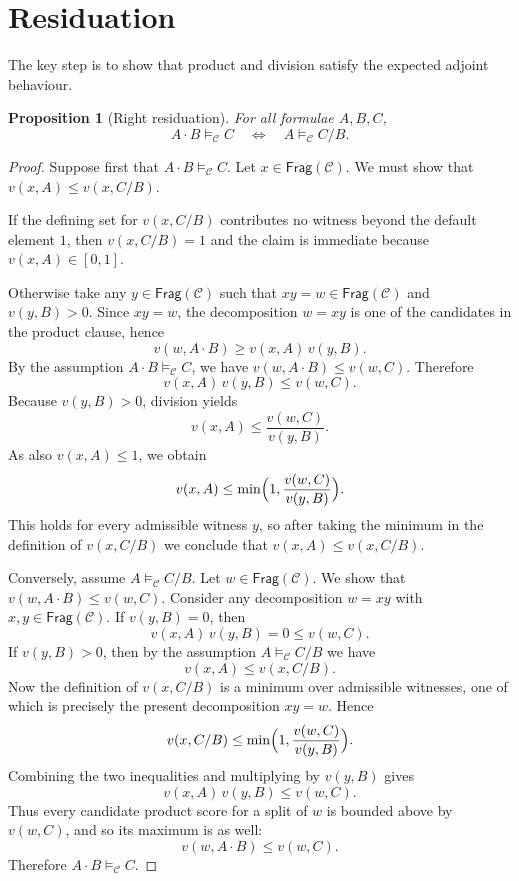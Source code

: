 \documentclass[12pt,a4paper]{report}
\newtheorem{proposition}[theorem]{Proposition}
\theoremstyle{definition}
\newcommand{\Frag}{\mathsf{Frag}}
\newcommand{\Sem}{\models_{\mathcal C}}
\newcommand{\concat}{\mathbin{\cdot}}
\begin{document}
\section{Residuation}
The key step is to show that product and division satisfy the expected adjoint behaviour.

\begin{proposition}[Right residuation]
For all formulae $A,B,C$,
\[
A\concat B \Sem C
\quad\Longleftrightarrow\quad
A \Sem C/B.
\]
\end{proposition}

\begin{proof}
Suppose first that $A\concat B \Sem C$. Let $x \in \Frag(\mathcal C)$. We must show that
$v(x,A) \leq v(x,C/B)$.

If the defining set for $v(x,C/B)$ contributes no witness beyond the default element $1$, then
$v(x,C/B)=1$ and the claim is immediate because $v(x,A) \in [0,1]$.

Otherwise take any $y \in \Frag(\mathcal C)$ such that $xy=w \in \Frag(\mathcal C)$ and
$v(y,B)>0$. Since $xy=w$, the decomposition $w=xy$ is one of the candidates in the product
clause, hence
\[
v(w,A\concat B) \geq v(x,A)\,v(y,B).
\]
By the assumption $A\concat B \Sem C$, we have $v(w,A\concat B) \leq v(w,C)$. Therefore
\[
v(x,A)\,v(y,B) \leq v(w,C).
\]
Because $v(y,B)>0$, division yields
\[
v(x,A) \leq \frac{v(w,C)}{v(y,B)}.
\]
As also $v(x,A)\leq 1$, we obtain
\[
v(x,A) \leq \min\Bigl(1,\frac{v(w,C)}{v(y,B)}\Bigr).
\]
This holds for every admissible witness $y$, so after taking the minimum in the definition of
$v(x,C/B)$ we conclude that $v(x,A) \leq v(x,C/B)$.

Conversely, assume $A \Sem C/B$. Let $w \in \Frag(\mathcal C)$. We show that
$v(w,A\concat B) \leq v(w,C)$. Consider any decomposition $w=xy$ with $x,y \in \Frag(\mathcal C)$.
If $v(y,B)=0$, then
\[
v(x,A)\,v(y,B)=0 \leq v(w,C).
\]
If $v(y,B)>0$, then by the assumption $A \Sem C/B$ we have
\[
v(x,A) \leq v(x,C/B).
\]
Now the definition of $v(x,C/B)$ is a minimum over admissible witnesses, one of which is
precisely the present decomposition $xy=w$. Hence
\[
v(x,C/B) \leq \min\Bigl(1,\frac{v(w,C)}{v(y,B)}\Bigr).
\]
Combining the two inequalities and multiplying by $v(y,B)$ gives
\[
v(x,A)\,v(y,B) \leq v(w,C).
\]
Thus every candidate product score for a split of $w$ is bounded above by $v(w,C)$, and so
its maximum is as well:
\[
v(w,A\concat B) \leq v(w,C).
\]
Therefore $A\concat B \Sem C$.
\end{proof}
\end{document}
